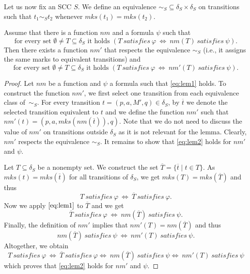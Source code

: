 \documentclass[a4paper,UKenglish,cleveref,autoref,thm-restate]{lipics-v2021}
\newcommand{\mks}{\mathit{mks}}
\newcommand{\rem}{\mathit{nm}}
\newcommand{\msat}{\mathit{satisfies}}
\begin{document}
Let us now fix an SCC $S$. We define an equivalence
${\sim_S}\subseteq\delta_S\times\delta_S$ on transitions %
such that $t_1\sim_S t_2$ whenever $\mks(t_1)=\mks(t_2)$.
\begin{lemma} Assume that there is a function $\rem$ and a formula
  $\psi$ such that
  \[
    \textrm{for every set $\emptyset\neq T\subseteq\delta_S$ it holds }
      (T~\msat~\varphi~\iff~\rem(T)~\msat~\psi).\tag{$1$}\label{eq:lem1} 
  \]  
  Then there exists a function $\rem'$ that respects the equivalence
  $\sim_S$ (i.e., it assigns the same marks to equivalent transitions)
  and
  \[
    \textrm{for every set $\emptyset\neq T\subseteq\delta_S$ it holds }
    (T~\msat~\varphi~\iff~\rem'(T)~\msat~\psi).\tag{$2$}\label{eq:lem2} 
  \]  
\end{lemma}
\begin{proof}
  Let $\rem$ be a function and $\psi$ a formula such that
  \eqref{eq:lem1} holds. To construct the function $\rem'$, we first
  select one transition from each equivalence class of~$\sim_S$. For
  every transition $t=(p,a,M',q)\in\delta_S$, by $\overline{t}$ we
  denote the selected transition equivalent to $t$ and we define the
  function $\rem'$ such that
  $\rem'(t)=(p,a,\mks(\rem(\overline{t})),q)$. Note that we do not need
  to discuss the value of $\rem'$ on transitions outside $\delta_S$ as
  it is not relevant for the lemma. Clearly, $\rem'$ respects the
  equivalence $\sim_S$. It remains to show that \eqref{eq:lem2} holds
  for $\rem'$ and $\psi$.

  Let $T\subseteq\delta_S$ be a %
  nonempty set. We construct
  the set $\overline{T}=\{\overline{t}\mid t\in T\}$. As
  $\mks(t)=\mks(\overline{t})$ for all transitions of $\delta_S$, we
  get $\mks(T)=\mks(\overline{T})$ and thus
  \[
    T~\msat~\varphi~\iff~\overline{T}~\msat~\varphi.
  \]
  Now we apply $\eqref{eq:lem1}$ to $\overline{T}$ and we get %
  \[
    \overline{T}~\msat~\varphi~\iff~\rem(\overline{T})~\msat~\psi.
  \]
  Finally, the definition of $\rem'$ implies that
  $\rem'(T)=\rem(\overline{T})$ and thus
  \[
    \rem(\overline{T})~\msat~\psi~\iff~\rem'(T)~\msat~\psi.
  \]
  Altogether, we obtain
  \[
      T~\msat~\varphi~ 
      \iff~\overline{T}~\msat~\varphi
      \iff~\rem(\overline{T})~\msat~\psi
      \iff~\rem'(T)~\msat~\psi
  \]  
  which proves that \eqref{eq:lem2} holds for $\rem'$ and $\psi$.%
\end{proof}
\end{document}
